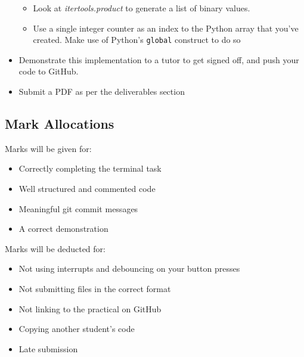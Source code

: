 \begin{itemize}
    \begin{itemize}
    \itemsep0em 
        \item Look at \textit{itertools.product} to generate a list of binary values.
        \item Use a single integer counter as an index to the Python array that you've created. Make use of Python's \verb|global| construct to do so
    \end{itemize}
    \item Demonstrate this implementation to a tutor to get signed off, and push your code to GitHub.
    \item Submit a PDF as per the deliverables section
\end{itemize}

\subsection{Mark Allocations}
Marks will be given for:
\begin{itemize}
\itemsep0em 
    \item Correctly completing the terminal task
    \item Well structured and commented code
    \item Meaningful git commit messages
    \item A correct demonstration
\end{itemize}
Marks will be deducted for:
\begin{itemize}
\itemsep0em 
    \item Not using interrupts and debouncing on your button presses
    \item Not submitting files in the correct format
    \item Not linking to the practical on GitHub
    \item Copying another student's code
    \item Late submission
\end{itemize}